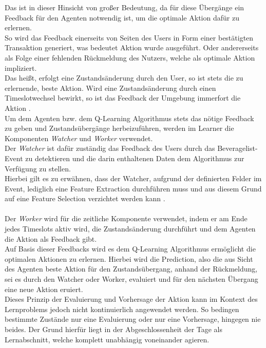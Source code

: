 Das ist in dieser Hinsicht von großer Bedeutung, da für diese Übergänge ein Feedback für den Agenten notwendig ist, um die optimale Aktion dafür zu erlernen. \\
So wird das Feedback einerseits von Seiten des Users in Form einer bestätigten Transaktion generiert, was bedeutet Aktion  wurde ausgeführt. Oder andererseits als Folge einer fehlenden Rückmeldung des Nutzers, welche  als optimale Aktion impliziert. \\
Das heißt, erfolgt eine Zustandsänderung durch den User, so ist stets  die zu erlernende, beste Aktion. Wird eine Zustandsänderung durch einen Timeslotwechsel bewirkt, so ist das Feedback der Umgebung immerfort die Aktion . \\
Um dem Agenten bzw. dem Q-Learning Algorithmus stets das nötige Feedback zu geben und Zustandsübergänge herbeizuführen, werden im Learner die Komponenten \textit{Watcher} und \textit{Worker} verwendet. \\
Der \textit{Watcher} ist dafür zuständig das Feedback des Users durch das Beveragelist-Event zu detektieren und die darin enthaltenen Daten dem Algorithmus zur Verfügung zu stellen. \\
Hierbei gilt es zu erwähnen, dass der Watcher, aufgrund der definierten Felder im Event, lediglich eine Feature Extraction durchführen muss und aus diesem Grund auf eine Feature Selection verzichtet werden kann \cite{fteng}.\\\\ 
Der \textit{Worker} wird für die zeitliche Komponente verwendet, indem er am Ende jedes Timeslots aktiv wird, die Zustandsänderung durchführt und dem Agenten die Aktion  als Feedback gibt. \\
Auf Basis dieser Feedbacks wird es dem Q-Learning Algorithmus ermöglicht die optimalen Aktionen zu erlernen. Hierbei wird die Prediction, also die aus Sicht des Agenten beste Aktion für den Zustandsübergang, anhand der Rückmeldung, sei es durch den Watcher oder Worker, evaluiert und für den nächsten Übergang eine neue Aktion eruiert. \\
Dieses Prinzip der Evaluierung und Vorhersage der Aktion kann im Kontext des Lernproblems jedoch nicht kontinuierlich angewendet werden. 
So bedingen bestimmte Zustände nur eine Evaluierung oder nur eine Vorhersage, hingegen nie beides. Der Grund hierfür liegt in der Abgeschlossenheit der Tage als Lernabschnitt, welche komplett unabhängig voneinander agieren. \\
